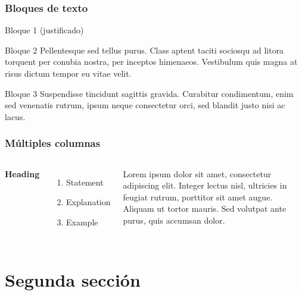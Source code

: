 
\begin{frame}
	\frametitle{Bloques de texto}
	\begin{block}{Bloque 1 (justificado)}
	\end{block}
	
	\begin{block}{Bloque 2}
		Pellentesque sed tellus purus. Class aptent taciti sociosqu ad litora torquent per conubia nostra, per inceptos himenaeos. Vestibulum quis magna at risus dictum tempor eu vitae velit.
	\end{block}
	
	\begin{block}{Bloque 3}
		Suspendisse tincidunt sagittis gravida. Curabitur condimentum, enim sed venenatis rutrum, ipsum neque consectetur orci, sed blandit justo nisi ac lacus.
	\end{block}
\end{frame}


\begin{frame}
	\frametitle{Múltiples columnas}
	\begin{columns}[c]
		
		\textbf{Heading}
		\begin{enumerate}
			\item Statement
			\item Explanation
			\item Example
		\end{enumerate}
		
		Lorem ipsum dolor sit amet, consectetur adipiscing elit. Integer lectus nisl, ultricies in feugiat rutrum, porttitor sit amet augue. Aliquam ut tortor mauris. Sed volutpat ante purus, quis accumsan dolor.
		
	\end{columns}
\end{frame}

\section{Segunda sección}

